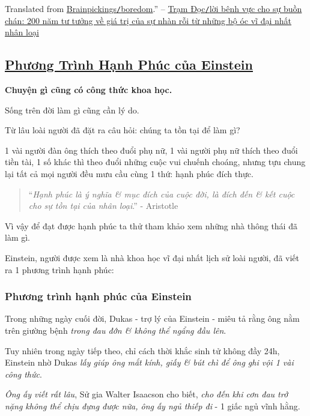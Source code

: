 \documentclass{article}
\begin{document}
Translated from \href{https://www.brainpickings.org/2015/03/16/boredom/}{Brainpickings{\tt/}boredom}.'' -- \href{https://tramdoc.vn/tin-tuc/loi-benh-vuc-cho-su-buon-chan-200-nam-tu-tuong-ve-gia-tri-cua-su-nhan-roi-tu-nhung-bo-oc-vi-dai-nhat-nhan-loai-nnlAW.html}{Trạm Đọc{\tt/}lời bênh vực cho sự buồn chán: 200 năm tư tưởng về giá trị của sự nhàn rỗi từ những bộ óc vĩ đại nhất nhân loại}


\subsection{\href{http://tramdoc.vn/tin-tuc/phuong-trinh-hanh-phuc-cua-einstein-nzGgvW.html}{Phương Trình Hạnh Phúc của Einstein}}

\textbf{Chuyện gì cũng có công thức khoa học.}

%
Sống trên đời làm gì cũng cần lý do.

Từ lâu loài người đã đặt ra câu hỏi: chúng ta tồn tại để làm gì?

1 vài người đàn ông thích theo đuổi phụ nữ, 1 vài người phụ nữ thích theo đuổi tiền tài, 1 số khác thì theo đuổi những cuộc vui chuếnh choáng, nhưng tựu chung lại tất cả mọi người đều mưu cầu cùng 1 thứ: hạnh phúc đích thực.
\begin{quotation}
	``\textit{Hạnh phúc là ý nghĩa \& mục đích của cuộc đời, là đích đến \& kết cuộc cho sự tồn tại của nhân loại}.'' - Aristotle
\end{quotation}
Vì vậy để đạt được hạnh phúc ta thử tham khảo xem những nhà thông thái đã làm gì.

Einstein, người được xem là nhà khoa học vĩ đại nhất lịch sử loài người, đã viết ra 1 phương trình hạnh phúc:

\subsubsection{Phương trình hạnh phúc của Einstein}
Trong những ngày cuối đời, Dukas - trợ lý của Einstein - miêu tả rằng ông nằm trên giường bệnh \textit{trong đau đớn \& không thể ngẩng đầu lên}.

%
Tuy nhiên trong ngày tiếp theo, chỉ cách thời khắc sinh tử không đầy 24h, Einstein nhờ Dukas \textit{lấy giúp ông mắt kính, giấy \& bút chì để ông ghi vội 1 vài công thức}.

%
\textit{Ông ấy viết rất lâu}, Sử gia Walter Isaacson cho biết, \textit{cho đến khi cơn đau trở nặng không thể chịu đựng được nữa, ông ấy ngủ thiếp đi} - 1 giấc ngủ vĩnh hằng.
\end{document}
